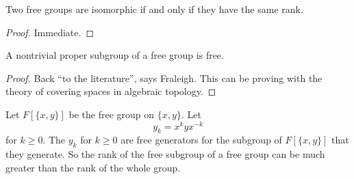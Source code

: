 \begin{theorem}
    Two free groups are isomorphic if and only if they have the same rank.
\end{theorem}
\begin{proof}
    Immediate.
\end{proof}
\begin{theorem}
A nontrivial proper subgroup of a free group is free.    
\end{theorem}
\begin{proof}
    Back ``to the literature'', says Fraleigh. This can be proving with the theory of covering spaces in algebraic topology.
\end{proof}
\begin{example}
    Let $F[\{x,y\}]$ be the free group on $\{x,y\} $. Let \[
    y_k=x^{k}yx^{-k}
\] for $k \geq 0$. The $y_k$ for $k\geq 0$ are free generators for the subgroup of $F[\{x,y\}]$ that they generate. So the rank of the free subgroup of a free group can be much greater than the rank of the whole group.
\end{example}
